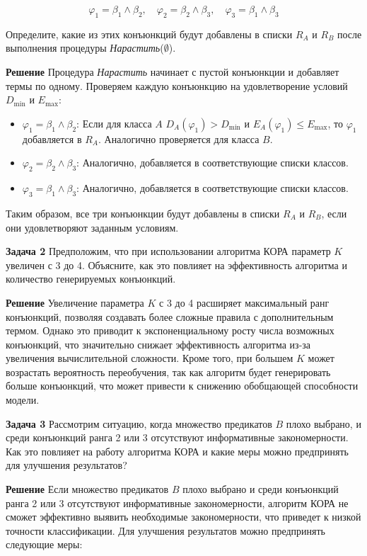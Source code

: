 \begin{itemize}
\[
\varphi_1 = \beta_1 \wedge \beta_2, \quad \varphi_2 = \beta_2 \wedge \beta_3, \quad \varphi_3 = \beta_1 \wedge \beta_3
\]

Определите, какие из этих конъюнкций будут добавлены в списки \( R_A \) и \( R_B \) после выполнения процедуры \textit{Нарастить}(\(\emptyset\)).

\textbf{Решение}  
Процедура \textit{Нарастить} начинает с пустой конъюнкции и добавляет термы по одному. Проверяем каждую конъюнкцию на удовлетворение условий \( D_{\text{min}} \) и \( E_{\text{max}} \):

\begin{itemize}
    \item \(\varphi_1 = \beta_1 \wedge \beta_2\): Если для класса \(A\) \(D_A(\varphi_1) > D_{\text{min}}\) и \(E_A(\varphi_1) \leq E_{\text{max}}\), то \(\varphi_1\) добавляется в \( R_A \). Аналогично проверяется для класса \(B\).
    \item \(\varphi_2 = \beta_2 \wedge \beta_3\): Аналогично, добавляется в соответствующие списки классов.
    \item \(\varphi_3 = \beta_1 \wedge \beta_3\): Аналогично, добавляется в соответствующие списки классов.
\end{itemize}

Таким образом, все три конъюнкции будут добавлены в списки \( R_A \) и \( R_B \), если они удовлетворяют заданным условиям.

\textbf{Задача 2}  
Предположим, что при использовании алгоритма КОРА параметр \( K \) увеличен с 3 до 4. Объясните, как это повлияет на эффективность алгоритма и количество генерируемых конъюнкций.

\textbf{Решение}  
Увеличение параметра \( K \) с 3 до 4 расширяет максимальный ранг конъюнкций, позволяя создавать более сложные правила с дополнительным термом. Однако это приводит к экспоненциальному росту числа возможных конъюнкций, что значительно снижает эффективность алгоритма из-за увеличения вычислительной сложности. Кроме того, при большем \( K \) может возрастать вероятность переобучения, так как алгоритм будет генерировать больше конъюнкций, что может привести к снижению обобщающей способности модели.

\textbf{Задача 3}  
Рассмотрим ситуацию, когда множество предикатов \( B \) плохо выбрано, и среди конъюнкций ранга 2 или 3 отсутствуют информативные закономерности. Как это повлияет на работу алгоритма КОРА и какие меры можно предпринять для улучшения результатов?

\textbf{Решение}  
Если множество предикатов \( B \) плохо выбрано и среди конъюнкций ранга 2 или 3 отсутствуют информативные закономерности, алгоритм КОРА не сможет эффективно выявить необходимые закономерности, что приведет к низкой точности классификации. Для улучшения результатов можно предпринять следующие меры:


\end{itemize}
